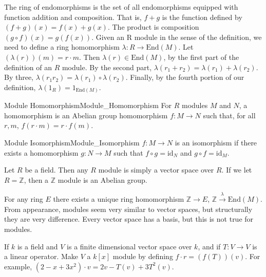 \documentclass[crop=false,class=book,oneside]{standalone}                      %
\begin{document}
        The ring of endomorphisms is the set of all endomorphisms equipped
        with function addition and composition. That is,
        $f+g$ is the function defined by $(f+g)(x)=f(x)+g(x)$. The product
        is composition $(g\circ{f})(x)=g(f(x))$.
        Given an R module in the sense of the definition, we need to define
        a ring homomorphism $\lambda:R\rightarrow\textrm{End}(M)$.
        Let $(\lambda(r))(m)=r\cdot{m}$. Then $\lambda(r)\in\textrm{End}(M)$,
        by the first part of the definition of an $R$ module. By the second
        part, $\lambda(r_{1}+r_{2})=\lambda(r_{1})+\lambda(r_{2})$. By three,
        $\lambda(r_{1}r_{2})=\lambda(r_{1})\circ\lambda(r_{2})$. Finally, by
        the fourth portion of our definition,
        $\lambda(1_{R})=1_{\textrm{End}(M)}$.
        \begin{ldefinition}{Module Homomorphism}{Module_Homomorphism}
            For $R$ modules $M$ and $N$, a homomorphism is an Abelian group
            homomorphism $f:M\rightarrow{N}$ such that, for all $r,m$,
            $f(r\cdot{m})=r\cdot{f}(m)$.
        \end{ldefinition}
        \begin{ldefinition}{Module Isomorphism}{Module_Isomorphism}
            $f:M\rightarrow{N}$ is an isomorphism if there exists a
            homomorphism $g:N\rightarrow{M}$ such that
            $f\circ{g}=\textrm{id}_{N}$ and $g\circ{f}=\textrm{id}_{M}$.
        \end{ldefinition}
        \begin{example}
            Let $R$ be a field. Then any $R$ module is simply a vector space
            over $R$. If we let $R=\mathbb{Z}$, then a $\mathbb{Z}$ module
            is an Abelian group.
        \end{example}
        For any ring $E$ there exists a unique ring homomorphism
        $\mathbb{Z}\rightarrow{E}$,
        $\mathbb{Z}\overset{\lambda}{\rightarrow}\textrm{End}(M)$.
        From appearance, modules seem very similar to vector spaces, but
        structurally they are very difference. Every vector space has a
        basis, but this is not true for modules.
        \begin{lexample}{}{}
            If $k$ is a field and $V$ is a finite dimensional vector space
            over $k$, and if $T:V\rightarrow{V}$ is a linear operator. Make
            $V$ a $k[x]$ module by defining $f\cdot{r}=(f(T))(v)$. For
            example, $(2-x+3x^2)\cdot{v}=2v-T(v)+3T^{2}(v)$.
        \end{lexample}
\end{document}
